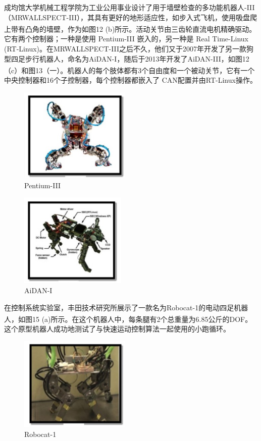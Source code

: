 \documentclass[12pt,a4paper]{ctexart}
\newcommand{\supercite}[1]{\textsuperscript{\cite{#1}}}
\begin{document}
{成均馆大学机械工程学院为工业公用事业设计了用于墙壁检查的多功能机器人-III（MRWALLSPECT-III），其具有更好的地形适应性，如步入式飞机，使用吸盘爬上带有凸角的墙壁，作为如图12 (b)\supercite{20}所示。活动关节由三齿轮直流电机精确驱动。它有两个控制器；一种是使用 Pentium-III 嵌入的，另一种是 Real Time-Linux (RT-Linux)。在MRWALLSPECT-III之后不久，他们又于2007年开发了另一款狗型四足步行机器人，命名为AiDAN-I，随后于2013年开发了AiDAN-III，如图12（c）和图13（一）\supercite{21}\supercite{22}。机器人的每个肢体都有3个自由度和一个被动关节，它有一个中央控制器和16个子控制器，每个控制器都嵌入了 CAN配置并由RT-Linux操作。
\begin{figure}[H]
	\centering
	\includegraphics[height=4.5cm]{IMG_07.jpg}
	\caption{Pentium-III}
\end{figure}
\begin{figure}[H]
	\centering
	\includegraphics[height=4.5cm]{IMG_06.jpg}
	\caption{AiDAN-I}
\end{figure}
在控制系统实验室，丰田技术研究所展示了一款名为Robocat-1的电动四足机器人，如图15 (a)\supercite{23}所示。在这个机器人中，每条腿有2个总重量为6.85公斤的DOF。这个原型机器人成功地测试了与快速运动控制算法一起使用的小跑循环。
\begin{figure}[H]
	\centering
	\includegraphics[height=4.5cm]{IMG_08.jpg}
	\caption{Robocat-1}
\end{figure}
}
\end{document}
